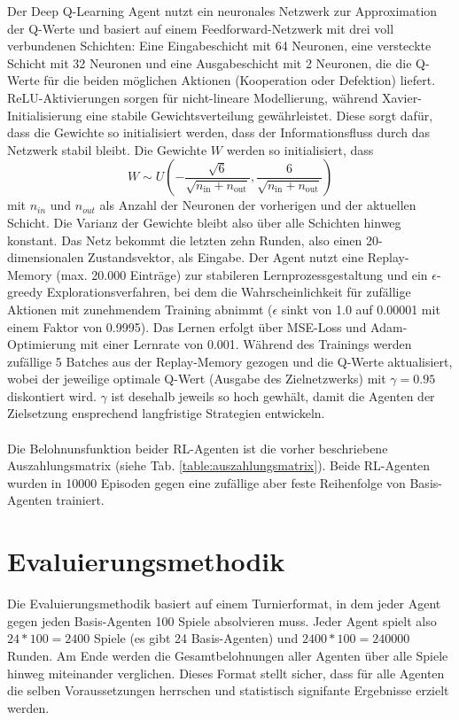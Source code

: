 Der Deep Q-Learning Agent nutzt ein neuronales Netzwerk zur Approximation der Q-Werte und basiert auf einem 
Feedforward-Netzwerk mit drei voll verbundenen Schichten: Eine Eingabeschicht mit 64 Neuronen, eine versteckte 
Schicht mit 32 Neuronen und eine Ausgabeschicht mit 2 Neuronen, die die Q-Werte für die beiden möglichen Aktionen 
(Kooperation oder Defektion) liefert. ReLU-Aktivierungen sorgen für nicht-lineare Modellierung, während Xavier-Initialisierung 
eine stabile Gewichtsverteilung gewährleistet. Diese sorgt dafür, dass die Gewichte so initialisiert werden, dass der 
Informationsfluss durch das Netzwerk stabil bleibt. Die Gewichte $W$ werden so initialisiert, dass
\begin{equation}
    W \sim U \left( -\frac{\sqrt{6}}{\sqrt{n_{\text{in}}+n_{\text{out}}}}, \frac{6}{\sqrt{n_{\text{in}}+n_{\text{out}}}} \right)
\end{equation}
mit $n_{in}$ und $n_{out}$ als Anzahl der Neuronen der vorherigen und der aktuellen Schicht. Die Varianz der Gewichte bleibt
also über alle Schichten hinweg konstant.
Das Netz bekommt die letzten zehn Runden, also einen 20-dimensionalen 
Zustandsvektor, als Eingabe. Der Agent nutzt eine Replay-Memory (max. 20.000 Einträge) zur stabileren 
Lernprozessgestaltung und ein $\epsilon$-greedy Explorationsverfahren, bei dem die Wahrscheinlichkeit für zufällige Aktionen mit 
zunehmendem Training abnimmt ($\epsilon$ sinkt von 1.0 auf 0.00001 mit einem Faktor von 0.9995). Das Lernen erfolgt über MSE-Loss und Adam-Optimierung mit 
einer Lernrate von 0.001.
Während des Trainings werden zufällige 5 Batches aus der Replay-Memory gezogen und die Q-Werte 
aktualisiert, wobei der jeweilige optimale Q-Wert (Ausgabe des Zielnetzwerks) mit $\gamma=0.95$ diskontiert wird. $\gamma$ ist desehalb jeweils
so hoch gewhält, damit die Agenten der Zielsetzung ensprechend langfristige Strategien entwickeln.\\ \\
Die Belohnunsfunktion beider RL-Agenten ist die vorher beschriebene Auszahlungsmatrix (siehe Tab. \ref{table:auszahlungsmatrix}).
Beide RL-Agenten wurden in 10000 Episoden gegen eine zufällige aber feste Reihenfolge von Basis-Agenten trainiert.


\section{Evaluierungsmethodik}
Die Evaluierungsmethodik basiert auf einem Turnierformat, in dem jeder Agent gegen jeden Basis-Agenten 100 Spiele 
absolvieren muss. Jeder Agent spielt also $24 * 100 = 2400$ Spiele (es gibt 24 Basis-Agenten) und $2400 * 100 = 240000$ Runden. 
Am Ende werden die Gesamtbelohnungen aller Agenten über alle Spiele hinweg miteinander verglichen.
Dieses Format stellt sicher, dass für alle Agenten die selben Voraussetzungen herrschen und statistisch signifante Ergebnisse erzielt werden.
